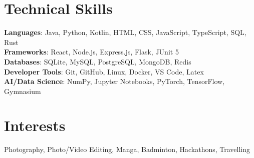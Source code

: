 \documentclass[letterpaper,11pt]{article}
\begin{document}
\section{Technical Skills}
\begin{itemize}[leftmargin=0.15in, label={}]
   \small{\item{
    \textbf{Languages}{:  Java, Python, Kotlin, HTML, CSS, JavaScript, TypeScript, SQL, Rust} \\
    \textbf{Frameworks}{: React, Node.js, Express.js, Flask, JUnit 5} \\
    \textbf{Databases}{: SQLite, MySQL, PostgreSQL, MongoDB, Redis} \\
    \textbf{Developer Tools}{: Git, GitHub, Linux, Docker, VS Code, Latex} \\
    \textbf{AI/Data Science}{: NumPy, Jupyter Notebooks, PyTorch, TensorFlow, Gymnasium}
   }}
\end{itemize}

 \section{Interests}
  \begin{itemize}[leftmargin=0.15in, label={}]
      \small{\item{
        Photography, Photo/Video Editing, Manga, Badminton, Hackathons, Travelling
      }}
  \end{itemize}

\end{document}
